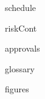 \label{sec_schedule}

\downsection
  {schedule}
\upsection

\label{sec_riskCont}

\downsection
  {riskCont}
\upsection

\label{sec_approvals}

\downsection
  {approvals}
\upsection


\label{sec_glossary}

\downsection
  {glossary}
\upsection

\label{sec_figures}

\downsection
  {figures}
\upsection
